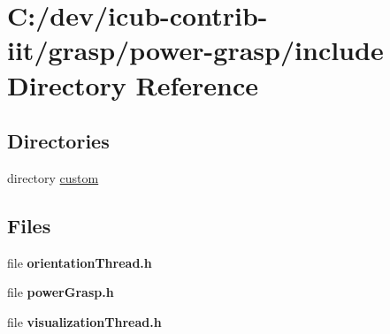 \section{C\+:/dev/icub-\/contrib-\/iit/grasp/power-\/grasp/include Directory Reference}
\label{dir_28a869c415a9705df3d185be1ad83cff}
\subsection*{Directories}
\begin{DoxyCompactItemize}
\item 
directory \hyperlink{dir_46bd45bc75c2916e437153cf58e10722}{custom}
\end{DoxyCompactItemize}
\subsection*{Files}
\begin{DoxyCompactItemize}
\item 
file {\bfseries orientation\+Thread.\+h}
\item 
file {\bfseries power\+Grasp.\+h}
\item 
file {\bfseries visualization\+Thread.\+h}
\end{DoxyCompactItemize}
